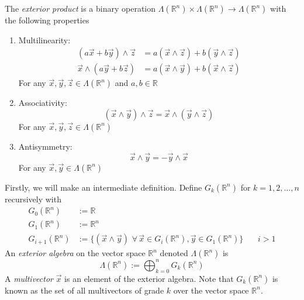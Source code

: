 \documentclass{article}
\numberwithin{equation}{section}
\newcommand{\R}{\mathbb{R}}
\newcommand{\smallspace}{\:\:\:\:\:\:\:\:}
\begin{document}
\begin{definition}
    The \textit{exterior product} is a binary operation $\Lambda(\R^n)\times\Lambda(\R^n)\to\Lambda(\R^n)$ with the following properties 
    \begin{enumerate}
        \item Multilinearity:
        \begin{align}
            (a\vec x+b\vec y)\wedge \vec z&=a(\vec x\wedge\vec z)+b(\vec y\wedge \vec z)\\
            \vec x\wedge (a\vec y+b\vec z) &=a(\vec x\wedge\vec y)+b(\vec x\wedge \vec z)
        \end{align}
        For any $\vec x,\vec y,\vec z\in\Lambda(\R^n)$ and $a,b\in\R$
        \item Associativity:
        \begin{equation}
            (\vec x\wedge\vec y)\wedge\vec z=\vec x\wedge(\vec y\wedge\vec z)
        \end{equation}
        For any $\vec x,\vec y,\vec z\in\Lambda(\R^n)$
        \item Antisymmetry:
        \begin{equation}
            \vec x\wedge\vec y=-\vec y\wedge\vec x
        \end{equation}
        For any $\vec x,\vec y\in\Lambda(\R^n)$
    \end{enumerate}
\end{definition}

\begin{definition}
    Firstly, we will make an intermediate definition. Define $G_k(\R^n)$ for $k=1,2,\dots,n$ recursively with 
    \begin{align}
        G_0(\R^n)&:=\R\\
        G_1(\R^n)&:=\R^n\\
        G_{i+1}(\R^n)&:=\{(\vec x\wedge \vec y)\,\, \forall\, \vec x\in G_{i}(\R^n),\vec y\in G_1(\R^n)\}\smallspace i>1
    \end{align}
    An \textit{exterior algebra} on the vector space $\R^n$ denoted $\Lambda(\R^n)$ is 
    \begin{equation}
        \Lambda(\R^n):=\bigoplus_{k=0}^nG_k(\R^n)\label{exterioralgebradef}
    \end{equation}
    A \textit{multivector} $\vec x$ is an element of the exterior algebra. Note that $G_k(\R^n)$ is known as the set of all multivectors of grade $k$ over the vector space $\R^n$.
\end{definition}
\end{document}
